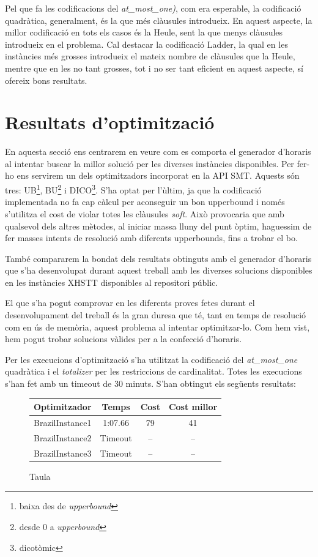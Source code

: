 \documentclass[11pt,a4paper,twoside]{report}
\begin{document}
  Pel que fa les codificacions del \textit{at\_most\_one)}, com era esperable, la codificació quadràtica, generalment, és la que més clàusules introdueix. 
  En aquest aspecte, la millor codificació en tots els casos és la Heule, sent la que menys clàusules introdueix en el problema. Cal destacar la codificació Ladder, 
  la qual en les instàncies més grosses introdueix el mateix nombre de clàusules que la Heule, mentre que en les no tant grosses, tot i no ser tant eficient en aquest aspecte, sí ofereix bons resultats.
  
  \section{Resultats d'optimització}


  En aquesta secció ens centrarem en veure com es comporta el generador d'horaris al intentar buscar la millor solució per les diverses instàncies disponibles. Per fer-ho ens servirem un dels optimitzadors incorporat en la API SMT. 
  Aquests són tres: UB\footnote{baixa des de \textit{upperbound}}, BU\footnote{desde 0 a \textit{upperbound}} i DICO\footnote{dicotòmic}.
  S'ha optat per l'ùltim, ja que la codificació implementada no fa cap càlcul per aconseguir un bon upperbound i només s'utilitza el cost de violar totes les clàusules \textit{soft}. 
  Això provocaria que amb qualsevol dels altres mètodes, al iniciar massa lluny del punt òptim, haguessim de fer masses intents de resolució amb diferents upperbounds, fins a trobar el bo. 

  També compararem la bondat dels resultats obtinguts amb el generador d'horaris que s'ha desenvolupat durant aquest treball amb les diverses solucions disponibles en les instàncies XHSTT disponibles al repositori públic. 

  El que s'ha pogut comprovar en les diferents proves fetes durant el desenvolupament del treball és la gran duresa que té, tant en temps de resolució com en ús de memòria, aquest problema al intentar optimitzar-lo. 
  Com hem vist, hem pogut trobar solucions vàlides per a la confecció d'horaris.

  Per les execucions d'optimització s'ha utilitzat la codificació del \textit{at\_most\_one} quadràtica i el \textit{totalizer} per les restriccions de cardinalitat. Totes les execucions s'han fet amb un timeout de 30 minuts. S'han obtingut els següents resultats:

\begin{figure}[ht!]
    \centering
    \begin{tabular}  { c| c | c | c}
      Optimitzador & Temps & Cost & Cost millor\\
      \hline
      BrazilInstance1 & 1:07.66 & 79 & 41\\
      BrazilInstance2 & Timeout & -- & --\\
      BrazilInstance3 & Timeout & -- & --\\

      
    \end{tabular}
    \caption{Taula }
    \label{fig:taula9}
  \end{figure}
\end{document}
